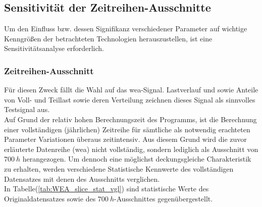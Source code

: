 \documentclass[onecolumn,10pt,titlepage]{article}
\begin{document}
\subsection{Sensitivität der Zeitreihen-Ausschnitte} %
Um den Einfluss bzw. dessen Signifikanz verschiedener Parameter auf wichtige Kenngrößen der betrachteten Technologien herauszustellen, ist eine Sensitivitätsanalyse erforderlich.\\
\subsubsection{Zeitreihen-Ausschnitt}
Für diesen Zweck fällt die Wahl auf das \gls{wea}-Signal. Lastverlauf und sowie Anteile von Voll- und Teillast sowie deren Verteilung zeichnen dieses Signal als sinnvolles Testsignal aus.\\
Auf Grund der relativ hohen Berechnungszeit des Programms, ist die Berechnung einer vollständigen (jährlichen) Zeitreihe für sämtliche als notwendig erachteten Parameter Variationen überaus zeitintensiv. Aus diesem Grund wird die zuvor erläuterte Datenreihe (\gls{wea}) nicht vollständig, sondern lediglich als Ausschnitt von $700~h$ herangezogen. Um dennoch eine möglichst deckungsgleiche Charakteristik zu erhalten, werden verschiedene Statistische Kennwerte des vollständigen Datensatzes mit denen des Ausschnitts verglichen.\\
In Tabelle(\ref{tab:WEA_slice_stat_vgl}) sind statistische Werte des Originaldatensatzes sowie des $700~h$-Ausschnittes gegenübergestellt.
\end{document}
